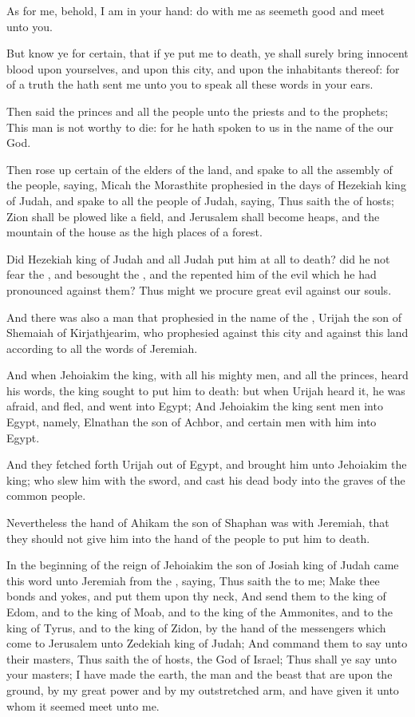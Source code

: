 \Verse As for me, behold, I am in your hand: do with me as seemeth good and meet unto you.

\Verse But know ye for certain, that if ye put me to death, ye shall surely bring innocent blood upon yourselves, and upon this city, and upon the inhabitants thereof: for of a truth the \LORD hath sent me unto you to speak all these words in your ears.

\Verse Then said the princes and all the people unto the priests and to the prophets; This man is not worthy to die: for he hath spoken to us in the name of the \LORD our God.

\Verse Then rose up certain of the elders of the land, and spake to all the assembly of the people, saying, \Verse Micah the Morasthite prophesied in the days of Hezekiah king of Judah, and spake to all the people of Judah, saying, Thus saith the \LORD of hosts; Zion shall be plowed like a field, and Jerusalem shall become heaps, and the mountain of the house as the high places of a forest.

\Verse Did Hezekiah king of Judah and all Judah put him at all to death?  did he not fear the \LORD, and besought the \LORD, and the \LORD repented him of the evil which he had pronounced against them? Thus might we procure great evil against our souls.

\Verse And there was also a man that prophesied in the name of the \LORD, Urijah the son of Shemaiah of Kirjathjearim, who prophesied against this city and against this land according to all the words of Jeremiah.

\Verse And when Jehoiakim the king, with all his mighty men, and all the princes, heard his words, the king sought to put him to death: but when Urijah heard it, he was afraid, and fled, and went into Egypt; \Verse And Jehoiakim the king sent men into Egypt, namely, Elnathan the son of Achbor, and certain men with him into Egypt.

\Verse And they fetched forth Urijah out of Egypt, and brought him unto Jehoiakim the king; who slew him with the sword, and cast his dead body into the graves of the common people.

\Verse Nevertheless the hand of Ahikam the son of Shaphan was with Jeremiah, that they should not give him into the hand of the people to put him to death.


\Chapter
\Verse In the beginning of the reign of Jehoiakim the son of Josiah king of Judah came this word unto Jeremiah from the \LORD, saying, \Verse Thus saith the \LORD to me; Make thee bonds and yokes, and put them upon thy neck, \Verse And send them to the king of Edom, and to the king of Moab, and to the king of the Ammonites, and to the king of Tyrus, and to the king of Zidon, by the hand of the messengers which come to Jerusalem unto Zedekiah king of Judah; \Verse And command them to say unto their masters, Thus saith the \LORD of hosts, the God of Israel; Thus shall ye say unto your masters; \Verse I have made the earth, the man and the beast that are upon the ground, by my great power and by my outstretched arm, and have given it unto whom it seemed meet unto me.

